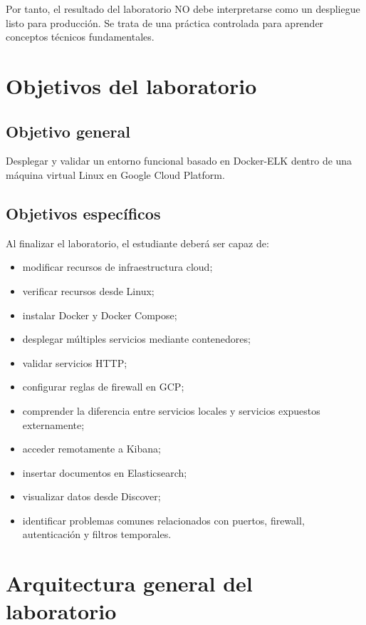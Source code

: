 \documentclass[
  coursetitle={Cómputo Nube y Tecnologías Emergentes},
  coursehours={96},
  coursedate={Verano 2026},
  doctype={Práctica},
  otherlangs={english,french},
  authorname={Lázaro},
  authorsurname={Bustio-Martínez},
  authortitle={PhD},
  role={Profesor Investigador},
  email={lbustio@inaoe.mx},
  phone={5559504000},
  ext={7459},
  institution={Instituto Nacional de Astrofísica, Óptica y Electrónica (INAOE)},
  department={Maestría en Ciencias en Tecnologías de Seguridad},
  address={Luis Enrique Erro 1, Sta. Ma. Tonantzintla, San Andrés Cholula, CP 72840, Puebla, México},
  margin={0.5in}
]{../../lbustio_lecture_notes}
\begin{document}
Por tanto, el resultado del laboratorio NO debe interpretarse como un despliegue listo para producción. Se trata de una práctica controlada para aprender conceptos técnicos fundamentales.

\section{Objetivos del laboratorio}

\subsection{Objetivo general}

Desplegar y validar un entorno funcional basado en Docker-ELK dentro de una máquina virtual Linux en Google Cloud Platform.

\subsection{Objetivos específicos}

Al finalizar el laboratorio, el estudiante deberá ser capaz de:

\begin{itemize}
    \item modificar recursos de infraestructura cloud;
    \item verificar recursos desde Linux;
    \item instalar Docker y Docker Compose;
    \item desplegar múltiples servicios mediante contenedores;
    \item validar servicios HTTP;
    \item configurar reglas de firewall en GCP;
    \item comprender la diferencia entre servicios locales y servicios expuestos externamente;
    \item acceder remotamente a Kibana;
    \item insertar documentos en Elasticsearch;
    \item visualizar datos desde Discover;
    \item identificar problemas comunes relacionados con puertos, firewall, autenticación y filtros temporales.
\end{itemize}

\section{Arquitectura general del laboratorio}
\end{document}
